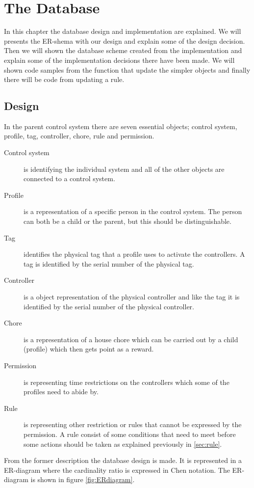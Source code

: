 \chapter{The Database}
\label{chap:database} 
In this chapter the database design and implementation are explained. We will presents the ER-shema with our design and explain some of the design decision. Then we will shown the database scheme created from the implementation and explain some of the implementation decisions there have been made. We will shown code samples from the function that update the simpler objects and finally there will be code from updating a rule.  
  
\section{Design}
\label{sec:DBdesign}
In the parent control system there are seven essential objects; control system, profile, tag, controller, chore, rule and permission. 

\begin{description}
	\item[Control system] is identifying the individual system and all of the other objects are connected to a control system.
	\item[Profile] is a representation of a specific person in the control system. The person can both be a child or the parent, but this should be distinguishable.
	\item[Tag] identifies the physical tag that a profile uses to activate the controllers. A tag is identified by the serial number of the physical tag.
	\item[Controller]	is a object representation of the physical controller and like the tag it is identified by the serial number of the physical controller.
	\item[Chore] is a representation of a house chore which can be carried out by a child (profile) which then gets point as a reward.
	\item[Permission] is representing time restrictions on the controllers which some of the profiles need to abide by. 
	\item[Rule] is representing other restriction or rules that cannot be expressed by the permission. A rule consist of some conditions that need to meet before some actions should be taken as explained previously in \vref{sec:rule}. 
\end{description}

From the former description the database design is made. It is represented in a ER-diagram where the cardinality ratio is expressed in 
Chen notation\citep{DatabaseKilde}. The ER-diagram is shown in figure \ref{fig:ERdiagram}. 

